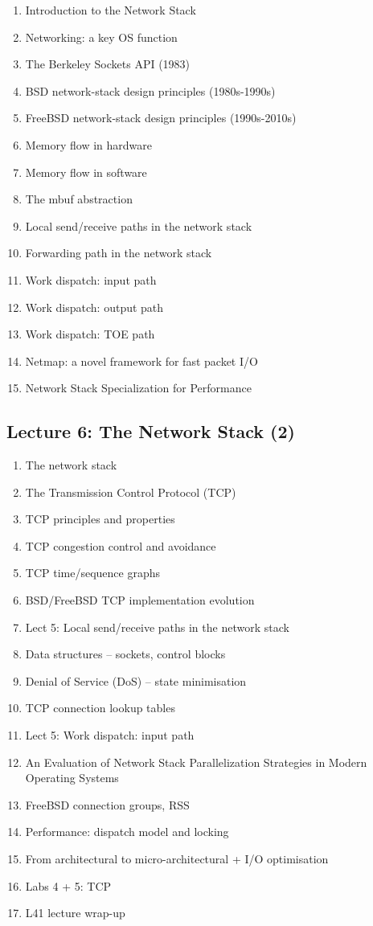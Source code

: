 \documentclass[a4paper,10pt]{article}
\begin{document}
\begin{enumerate}
  \item Introduction to the Network Stack
  \item Networking: a key OS function
  \item The Berkeley Sockets API (1983)
  \item BSD network-stack design principles (1980s-1990s)
  \item FreeBSD network-stack design principles (1990s-2010s)
  \item Memory flow in hardware
  \item Memory flow in software
  \item The mbuf abstraction
  \item Local send/receive paths in the network stack
  \item Forwarding path in the network stack
  \item Work dispatch: input path
  \item Work dispatch: output path
  \item Work dispatch: TOE path
  \item Netmap: a novel framework for fast packet I/O
  \item Network Stack Specialization for Performance
\end{enumerate}

\subsection*{Lecture 6: The Network Stack (2)}

\begin{enumerate}
  \item The network stack
  \item The Transmission Control Protocol (TCP)
  \item TCP principles and properties
  \item TCP congestion control and avoidance
  \item TCP time/sequence graphs
  \item BSD/FreeBSD TCP implementation evolution
  \item Lect 5: Local send/receive paths in the network stack
  \item Data structures -- sockets, control blocks
  \item Denial of Service (DoS) -- state minimisation
  \item TCP connection lookup tables
  \item Lect 5: Work dispatch: input path
  \item An Evaluation of Network Stack Parallelization Strategies in Modern
    Operating Systems
  \item FreeBSD connection groups, RSS
  \item Performance: dispatch model and locking
  \item From architectural to micro-architectural + I/O optimisation
  \item Labs 4 + 5: TCP
  \item L41 lecture wrap-up
\end{enumerate}
\end{document}
